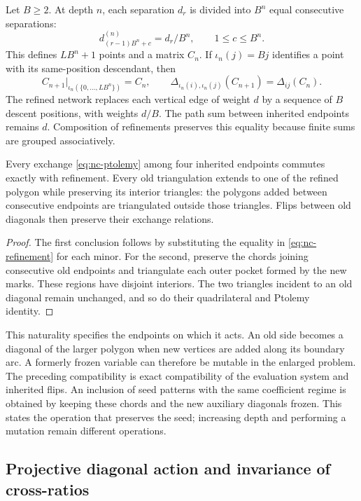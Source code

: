 Let \(B\ge2\). At depth \(n\), each separation \(d_r\) is
divided into \(B^n\) equal consecutive separations:
\[
 d^{(n)}_{(r-1)B^n+c}=d_r/B^n,
 \qquad 1\le c\le B^n.
\]
This defines \(LB^n+1\) points and a matrix \(C_n\). If
\(\iota_n(j)=Bj\) identifies a point with its same-position
descendant, then
\begin{equation}
 C_{n+1}|_{\iota_n(\{0,\ldots,LB^n\})}=C_n,
 \qquad
 \Delta_{\iota_n(i),\iota_n(j)}(C_{n+1})=\Delta_{ij}(C_n).
 \label{eq:nc-refinement}
\end{equation}
The refined network replaces each vertical edge of weight \(d\)
by a sequence of \(B\) descent positions, with weights \(d/B\).
The path sum between inherited endpoints remains \(d\).
Composition of refinements preserves this equality because finite
sums are grouped associatively.

\begin{proposition}
\label{prop:nc-inherited}
Every exchange \eqref{eq:nc-ptolemy} among four inherited endpoints
commutes exactly with refinement. Every old triangulation extends to
one of the refined polygon while preserving its interior triangles:
the polygons added between consecutive endpoints are triangulated
outside those triangles. Flips between old diagonals then preserve
their exchange relations.
\end{proposition}
\begin{proof}
The first conclusion follows by substituting the equality in
\eqref{eq:nc-refinement} for each minor. For the second, preserve
the chords joining consecutive old endpoints and triangulate each
outer pocket formed by the new marks. These regions have disjoint
interiors. The two triangles incident to an old diagonal remain
unchanged, and so do their quadrilateral and Ptolemy identity.
\end{proof}

This naturality specifies the endpoints on which it acts. An old
side becomes a diagonal of the larger polygon when new vertices
are added along its boundary arc. A formerly frozen variable can
therefore be mutable in the enlarged problem. The preceding
compatibility is exact compatibility of the evaluation system and
inherited flips. An inclusion of seed patterns with the same
coefficient regime is obtained by keeping these chords and the new
auxiliary diagonals frozen. This states the operation that preserves
the seed; increasing depth and performing a mutation remain different
operations.

\subsection{Projective diagonal action and invariance of cross-ratios}

